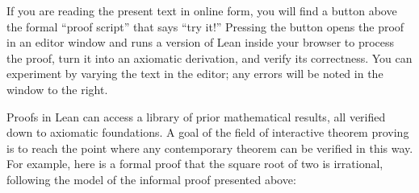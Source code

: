 \documentclass[letterpaper,10pt,english]{sphinxmanual}
\begin{document}
\sphinxAtStartPar
If you are reading the present text in online form, you will find a button above the formal “proof script” that says “try it!” Pressing the button opens the proof in an editor window and runs a version of Lean inside your browser to process the proof, turn it into an axiomatic derivation, and verify its correctness. You can experiment by varying the text in the editor; any errors will be noted in the window to the right.

\sphinxAtStartPar
Proofs in Lean can access a library of prior mathematical results, all verified down to axiomatic foundations. A goal of the field of interactive theorem proving is to reach the point where any contemporary theorem can be verified in this way. For example, here is a formal proof that the square root of two is irrational, following the model of the informal proof presented above:
\end{document}
